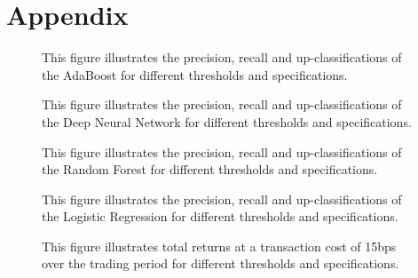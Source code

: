 \section{Appendix}


\begin{figure}[H]
    \captionsetup{format=plain}
    \caption{ 
            This figure illustrates the precision, recall and up-classifications of the 
            AdaBoost for different thresholds and specifications.
        }
    \label{fig:adaboost_threshold_vs_precision}
\end{figure}

\begin{figure}[H]
    \captionsetup{format=plain}
    \caption{ 
            This figure illustrates the precision, recall and up-classifications of the Deep Neural Network for different thresholds
            and specifications.
        }
    \label{fig:ann_threshold_vs_precision}
\end{figure}

\begin{figure}[H]
    \captionsetup{format=plain}
    \caption{ 
            This figure illustrates the precision, recall and up-classifications of the Random Forest for different thresholds
            and specifications.
        }
    \label{fig:forest_threshold_vs_precision}
\end{figure}

\begin{figure}[H]
    \captionsetup{format=plain}
    \caption{ 
            This figure illustrates the precision, recall and up-classifications of the Logistic Regression for different thresholds
            and specifications.
        }
    \label{fig:logistic_threshold_vs_precision}
\end{figure}


\begin{figure}[H]
    \captionsetup{format=plain}
    \caption{ 
        This figure illustrates total returns at a transaction cost of 15bps over the trading period for different thresholds
        and specifications.
        }
    \label{fig:all_threshold_vs_return}
\end{figure}


